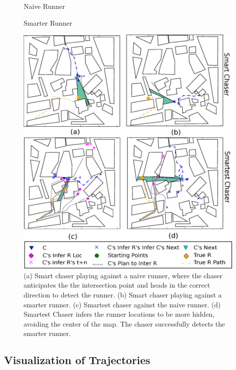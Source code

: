 \documentclass[twoside]{article}
\begin{document}
\begin{figure}[!t]
\begin{center}
\begin{minipage}[t]{0.4\linewidth}
\centerline{\textsf{\footnotesize Naive Runner}}
\end{minipage}
\begin{minipage}[t]{0.4\linewidth}
\centerline{\textsf{\footnotesize Smarter Runner}}
\end{minipage}

\centerline{\includegraphics[width=0.9\columnwidth]{detection_examples.eps}}
\caption{(a) Smart chaser playing against a naive runner, where the chaser anticipates the the intersection point and heads in the correct direction to detect the runner. (b) Smart chaser playing against a smarter runner. (c) Smartest chaser against the naive runner. (d) Smartest Chaser infers the runner locations to be more hidden, avoiding the center of the map. The chaser successfully detects the smarter runner.} %
\label{fig:exps}
\end{center}
\vspace{-1em}
\end{figure} 

\vspace{-0.25em}
\subsection{Visualization of Trajectories}
\vspace{-0.25em}
\end{document}
